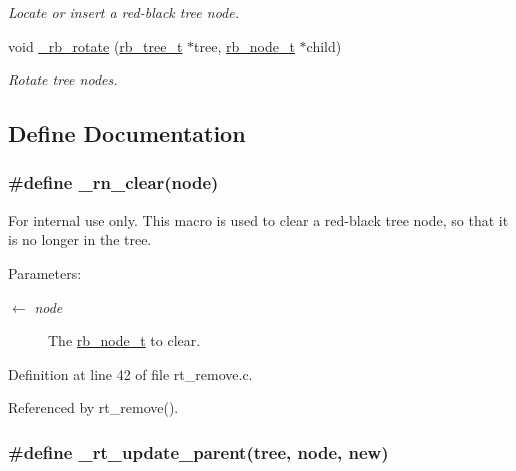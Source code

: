 \begin{CompactItemize}
\begin{CompactList}\small\item\em Locate or insert a red-black tree node. \item\end{CompactList}\item 
void \hyperlink{group__dbprim__rbtree_ga15}{\_\-rb\_\-rotate} (\hyperlink{struct__rb__tree__s}{rb\_\-tree\_\-t} $\ast$tree, \hyperlink{struct__rb__node__s}{rb\_\-node\_\-t} $\ast$child)
\begin{CompactList}\small\item\em Rotate tree nodes. \item\end{CompactList}\end{CompactItemize}


\subsection{Define Documentation}
\hypertarget{group__dbprim__rbtree_ga45}{
\subsubsection[\_\-rn\_\-clear]{\setlength{\rightskip}{0pt plus 5cm}\#define \_\-rn\_\-clear(node)}}
\label{group__dbprim__rbtree_ga45}


\begin{Desc}
\item[For internal use only.]
This macro is used to clear a red-black tree node, so that it is no longer in the tree.

\begin{Desc}
\item[Parameters:]
\begin{description}
\item[\mbox{$\leftarrow$} {\em node}]The \hyperlink{group__dbprim__rbtree_ga1}{rb\_\-node\_\-t} to clear.\end{description}
\end{Desc}
\end{Desc}


Definition at line 42 of file rt\_\-remove.c.

Referenced by rt\_\-remove().\hypertarget{group__dbprim__rbtree_ga46}{
\subsubsection[\_\-rt\_\-update\_\-parent]{\setlength{\rightskip}{0pt plus 5cm}\#define \_\-rt\_\-update\_\-parent(tree, node, new)}}
\label{group__dbprim__rbtree_ga46}


